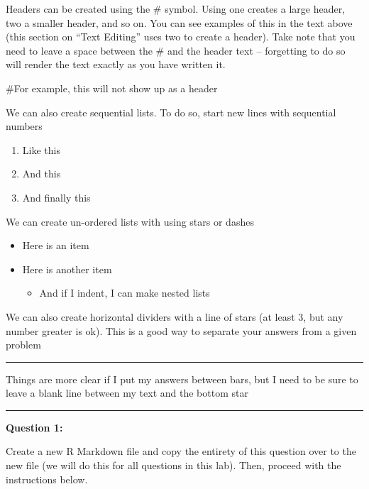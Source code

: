\documentclass[
]{article}
\providecommand{\tightlist}{%
  \setlength{\itemsep}{0pt}\setlength{\parskip}{0pt}}
\begin{document}
Headers can be created using the \# symbol. Using one creates a large
header, two a smaller header, and so on. You can see examples of this in
the text above (this section on ``Text Editing'' uses two to create a
header). Take note that you need to leave a space between the \# and the
header text -- forgetting to do so will render the text exactly as you
have written it.

\#For example, this will not show up as a header

We can also create sequential lists. To do so, start new lines with
sequential numbers

\begin{enumerate}
\def\labelenumi{\arabic{enumi}.}
\tightlist
\item
  Like this
\item
  And this
\item
  And finally this
\end{enumerate}

We can create un-ordered lists with using stars or dashes

\begin{itemize}
\tightlist
\item
  Here is an item
\item
  Here is another item

  \begin{itemize}
  \tightlist
  \item
    And if I indent, I can make nested lists
  \end{itemize}
\end{itemize}

We can also create horizontal dividers with a line of stars (at least 3,
but any number greater is ok). This is a good way to separate your
answers from a given problem

\begin{center}\rule{0.5\linewidth}{0.5pt}\end{center}

Things are more clear if I put my answers between bars, but I need to be
sure to leave a blank line between my text and the bottom star

\begin{center}\rule{0.5\linewidth}{0.5pt}\end{center}

\textbf{Question 1:}

Create a new R Markdown file and copy the entirety of this question over
to the new file (we will do this for all questions in this lab). Then,
proceed with the instructions below.
\end{document}
